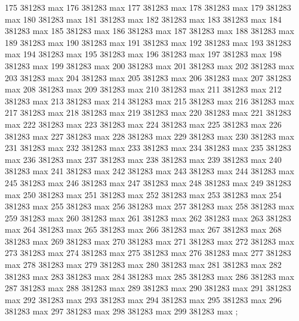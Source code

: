 {175 381283 max
176 381283 max
177 381283 max
178 381283 max
179 381283 max
180 381283 max
181 381283 max
182 381283 max
183 381283 max
184 381283 max
185 381283 max
186 381283 max
187 381283 max
188 381283 max
189 381283 max
190 381283 max
191 381283 max
192 381283 max
193 381283 max
194 381283 max
195 381283 max
196 381283 max
197 381283 max
198 381283 max
199 381283 max
200 381283 max
201 381283 max
202 381283 max
203 381283 max
204 381283 max
205 381283 max
206 381283 max
207 381283 max
208 381283 max
209 381283 max
210 381283 max
211 381283 max
212 381283 max
213 381283 max
214 381283 max
215 381283 max
216 381283 max
217 381283 max
218 381283 max
219 381283 max
220 381283 max
221 381283 max
222 381283 max
223 381283 max
224 381283 max
225 381283 max
226 381283 max
227 381283 max
228 381283 max
229 381283 max
230 381283 max
231 381283 max
232 381283 max
233 381283 max
234 381283 max
235 381283 max
236 381283 max
237 381283 max
238 381283 max
239 381283 max
240 381283 max
241 381283 max
242 381283 max
243 381283 max
244 381283 max
245 381283 max
246 381283 max
247 381283 max
248 381283 max
249 381283 max
250 381283 max
251 381283 max
252 381283 max
253 381283 max
254 381283 max
255 381283 max
256 381283 max
257 381283 max
258 381283 max
259 381283 max
260 381283 max
261 381283 max
262 381283 max
263 381283 max
264 381283 max
265 381283 max
266 381283 max
267 381283 max
268 381283 max
269 381283 max
270 381283 max
271 381283 max
272 381283 max
273 381283 max
274 381283 max
275 381283 max
276 381283 max
277 381283 max
278 381283 max
279 381283 max
280 381283 max
281 381283 max
282 381283 max
283 381283 max
284 381283 max
285 381283 max
286 381283 max
287 381283 max
288 381283 max
289 381283 max
290 381283 max
291 381283 max
292 381283 max
293 381283 max
294 381283 max
295 381283 max
296 381283 max
297 381283 max
298 381283 max
299 381283 max
};
